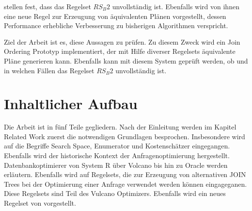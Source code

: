 \cite{shanbhag2014optimizing} stellen fest, dass das Regelset $RS_B2$ unvollständig ist. Ebenfalls wird von ihnen eine neue Regel zur Erzeugung von äquivalenten Plänen vorgestellt, dessen Performance erhebliche Verbesserung zu bisherigen Algorithmen verspricht.

Ziel der Arbeit ist es, diese Aussagen zu prüfen. Zu diesem Zweck wird ein Join Ordering Prototyp implementiert, der mit Hilfe diverser Regelsets äquivalente Pläne generieren kann. Ebenfalls kann mit diesem System geprüft werden, ob und in welchen Fällen das Regelset $RS_B2$ unvollständig ist.







\section{Inhaltlicher Aufbau}
Die Arbeit ist in fünf Teile gegliedern. Nach der Einleitung werden im Kapitel Related Work zuerst die notwendigen Grundlagen besprochen. Insbesondere wird auf die Begriffe Search Space, Enumerator und Kostenschätzer eingegangen. Ebenfalls wird der historische Kontext der Anfragenoptimierung hergestellt. Datenbankoptimierer von System R über Volcano bis hin zu Oracle werden erläutern. Ebenfalls wird auf Regelsets, die zur Erzeugung von alternativen JOIN Trees bei der Optimierung einer Anfrage verwendet werden können eingageganen. Diese Regelsets sind Teil des Vulcano Optimizers. Ebenfalls wird ein neues Regelset von \cite{shanbhag2014optimizing} vorgestellt.


